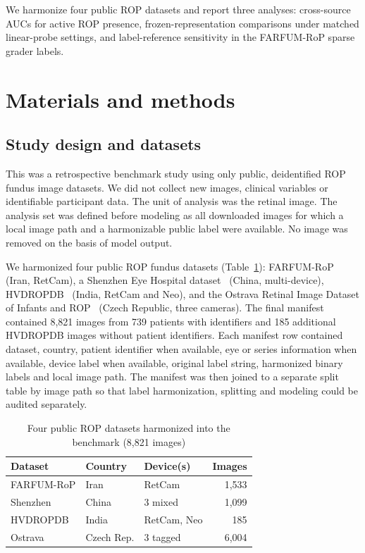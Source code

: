 \documentclass[pdflatex,sn-vancouver,Numbered,iicol]{sn-jnl}
\begin{document}
We harmonize four public ROP datasets and report three analyses: cross-source
AUCs for active ROP presence, frozen-representation comparisons under matched
linear-probe settings, and label-reference sensitivity in the FARFUM-RoP sparse
grader labels.

\section{Materials and methods}\label{sec:methods}

\subsection{Study design and datasets}
This was a retrospective benchmark study using only public, deidentified ROP
fundus image datasets. We did not collect new images, clinical variables or
identifiable participant data. The unit of analysis was the retinal image. The
analysis set was defined before modeling as all downloaded images for which a
local image path and a harmonizable public label were available. No image was
removed on the basis of model output.

We harmonized four public ROP fundus datasets (Table~\ref{tab:data}):
FARFUM-RoP~\cite{farfum2024} (Iran, RetCam), a Shenzhen Eye Hospital
dataset~\cite{shenzhen2024} (China, multi-device), HVDROPDB~\cite{hvdropdb2023}
(India, RetCam and Neo), and the Ostrava Retinal Image Dataset of Infants and
ROP~\cite{czech2024} (Czech Republic, three cameras). The final manifest contained
8{,}821 images from 739 patients with identifiers and 185 additional HVDROPDB
images without patient identifiers. Each manifest row contained dataset, country,
patient identifier when available, eye or series information when available,
device label when available, original label string, harmonized binary labels and
local image path. The manifest was then joined to a separate split table by image
path so that label harmonization, splitting and modeling could be audited
separately.

\begin{table}[t]\centering\footnotesize
\caption{Four public ROP datasets harmonized into the benchmark (8{,}821 images)}
\label{tab:data}
\setlength{\tabcolsep}{3pt}
\begin{tabular*}{\columnwidth}{@{\extracolsep{\fill}}lllr@{}}
\toprule
Dataset & Country & Device(s) & Images \\ \midrule
FARFUM-RoP & Iran & RetCam & 1{,}533 \\
Shenzhen   & China & 3 mixed & 1{,}099 \\
HVDROPDB   & India & RetCam, Neo & 185 \\
Ostrava    & Czech Rep. & 3 tagged & 6{,}004 \\
\bottomrule
\end{tabular*}
\end{table}
\end{document}
